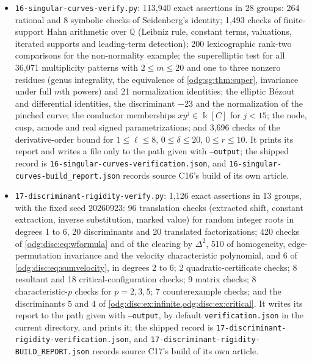 \documentclass[11pt,oneside]{article}
\numberwithin{equation}{section}
\theoremstyle{definition}
\theoremstyle{remark}
\newcommand{\Q}{\mathbb Q}
\newcommand{\fn}[1]{\nolinkurl{#1}}
\begin{document}
\begin{itemize}[leftmargin=*]
for the valuation-ring point). It prints its report and writes a file only to the path
given with \texttt{--output}; the shipped record is
\fn{15-logarithmic-rigidity-verification.json}, and
\fn{15-logarithmic-rigidity-build_report.json} records source C15's build of its own
article.
\item \fn{16-singular-curves-verify.py}: 113,940 exact assertions in 28 groups: 264 rational
and 8 symbolic checks of Seidenberg's identity; 1,493 checks of finite-support Hahn
arithmetic over $\Q$ (Leibniz rule, constant terms, valuations, iterated supports and
leading-term detection); 200 lexicographic rank-two comparisons for the non-normality
example; the superelliptic test for all 36,071 multiplicity patterns with $2\le m\le20$ and
one to three nonzero residues (genus integrality, the equivalence of
\cref{odg:sg:thm:super}, invariance under full $m$th powers) and 21 normalization
identities; the elliptic B\'ezout and differential identities, the discriminant $-23$ and the
normalization of the pinched curve; the conductor memberships $xy^j\in\Bbbk[C]$ for $j<15$;
the node, cusp, acnode and real signed parametrizations; and 3,696 checks of the
derivative-order bound for $1\le\ell\le8$, $0\le\delta\le20$, $0\le r\le10$. It prints its
report and writes a file only to the path given with \texttt{--output}; the shipped record
is \fn{16-singular-curves-verification.json}, and \fn{16-singular-curves-build_report.json}
records source C16's build of its own article.
\item \fn{17-discriminant-rigidity-verify.py}: 1,126 exact assertions in 13 groups, with the
fixed seed 20260923: 96 translation checks (extracted shift, constant extraction, inverse
substitution, marked value) for random integer roots in degrees 1 to 6, 20 discriminants
and 20 translated factorizations; 420 checks of \eqref{odg:disc:eq:wformula} and of the
clearing by $\Delta^2$, 510 of homogeneity, edge-permutation invariance and the velocity
characteristic polynomial, and 6 of \eqref{odg:disc:eq:sumvelocity}, in degrees 2 to 6; 2
quadratic-certificate checks; 8 resultant and 18 critical-configuration checks; 9 matrix
checks; 8 characteristic-$p$ checks for $p=2,3,5$; 7 counterexample checks; and the
discriminants $5$ and $4$ of \cref{odg:disc:ex:infinite,odg:disc:ex:critical}. It writes
its report to the path given with \texttt{--output}, by default \fn{verification.json} in
the current directory, and prints it; the shipped record is
\fn{17-discriminant-rigidity-verification.json}, and
\fn{17-discriminant-rigidity-BUILD_REPORT.json} records source C17's build of its own
article.
\end{itemize}
\end{document}
